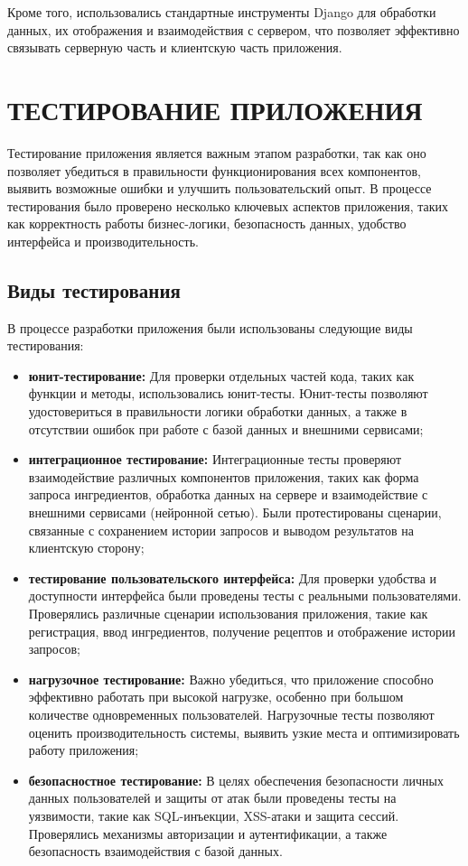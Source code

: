 {{    Кроме того, использовались стандартные инструменты Django для обработки данных, их отображения и взаимодействия с сервером, что позволяет эффективно связывать серверную часть и клиентскую часть приложения.
    
}

\newpage

\section{\MakeUppercase{Тестирование приложения}}
Тестирование приложения является важным этапом разработки, так как оно позволяет убедиться в правильности функционирования всех компонентов, выявить возможные ошибки и улучшить пользовательский опыт. В процессе тестирования было проверено несколько ключевых аспектов приложения, таких как корректность работы бизнес-логики, безопасность данных, удобство интерфейса и производительность.

\subsection{Виды тестирования}

В процессе разработки приложения были использованы следующие виды тестирования:

\begin{itemize}
    \item \textbf{юнит-тестирование:} Для проверки отдельных частей кода, таких как функции и методы, использовались юнит-тесты. Юнит-тесты позволяют удостовериться в правильности логики обработки данных, а также в отсутствии ошибок при работе с базой данных и внешними сервисами;
    \item \textbf{интеграционное тестирование:} Интеграционные тесты проверяют взаимодействие различных компонентов приложения, таких как форма запроса ингредиентов, обработка данных на сервере и взаимодействие с внешними сервисами (нейронной сетью). Были протестированы сценарии, связанные с сохранением истории запросов и выводом результатов на клиентскую сторону;
    \item \textbf{тестирование пользовательского интерфейса:} Для проверки удобства и доступности интерфейса были проведены тесты с реальными пользователями. Проверялись различные сценарии использования приложения, такие как регистрация, ввод ингредиентов, получение рецептов и отображение истории запросов;
    \item \textbf{нагрузочное тестирование:} Важно убедиться, что приложение способно эффективно работать при высокой нагрузке, особенно при большом количестве одновременных пользователей. Нагрузочные тесты позволяют оценить производительность системы, выявить узкие места и оптимизировать работу приложения;
    \item \textbf{безопасностное тестирование:} В целях обеспечения безопасности личных данных пользователей и защиты от атак были проведены тесты на уязвимости, такие как SQL-инъекции, XSS-атаки и защита сессий. Проверялись механизмы авторизации и аутентификации, а также безопасность взаимодействия с базой данных.
\end{itemize}

}

